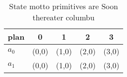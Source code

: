 \documentclass[a4paper]{article}
\begin{document}
\begin{table}
\begin{adjustbox}{width=0.7\columnwidth}
\begin{tabular}{|l|l|l|l|l|}
\hline
\textbf{plan} & \multicolumn{1}{c|}{\textbf{0}} & \multicolumn{1}{c|}{\textbf{1}} & \multicolumn{1}{c|}{\textbf{2}} & \multicolumn{1}{c|}{\textbf{3}} \\ \hline
\textbf{$a_0$}  & (0,0) & (1,0) & (2,0) & (3,0) \\ \hline
\textbf{$a_1$}  & (0,0) & (1,0) & (2,0) & (3,0) \\ \hline
\end{tabular}
\end{adjustbox}
\caption{State motto primitives are Soon thereater columbu
}
\end{table}
\end{document}

